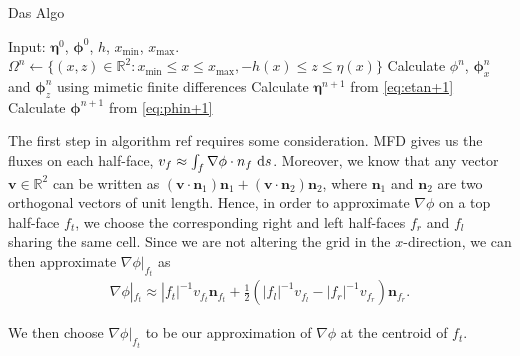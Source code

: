 \documentclass[12pt]{article}
\begin{document}
\begin{algorithm}
    \caption{Das Algo}
	\begin{algorithmic}[1]
	\State    Input: $\bm{\eta}^0$, $\bm{\phi}^0$, $h$, $x_{\min}$, $x_{\max}$.
	        \State    $\Omega^n \leftarrow \{(x,z) \in \mathbb{R}^2 : x_{\min} \leq x \leq x_{\max}, -h(x) \leq z \leq \eta(x)\}$ 
			\State    Calculate $\phi^{n}$, $\bm{\phi}_x^n$ and $\bm{\phi}_z^n$ using mimetic finite differences
			\State    Calculate $\bm{\eta}^{n+1}$ from \eqref{eq:etan+1}
			\State    Calculate $\bm{\phi}^{n+1}$ from \eqref{eq:phin+1}
        \EndFor
	\end{algorithmic}
\end{algorithm}

The first step in algorithm ref requires some consideration. MFD gives us the fluxes on each half-face, $v_{f} \approx \int_{f} \nabla \phi \cdot n_{f} \, \operatorname{d}\! s$.
Moreover, we know that any vector $\bm{v} \in \mathbb{R}^2$ can be written as $(\bm{v}\cdot\bm{n}_1) \bm{n}_1 + (\bm{v}\cdot\bm{n}_2) \bm{n}_2$,
where $\bm{n}_1$ and $\bm{n}_2$ are two orthogonal vectors of unit length.
Hence, in order to approximate $\nabla \phi$ on a top half-face $f_t$, we choose the corresponding right and left half-faces $f_r$ and $f_l$ sharing the same cell.
Since we are not altering the grid in the $x$-direction, we can then approximate $\nabla \phi|_{f_t}$ as
\begin{align*}
    \nabla \phi|_{f_t} \approx |f_t|^{-1} v_{f_t} \bm{n}_{f_t} + \frac{1}{2}(|f_l|^{-1}v_{f_l}-|f_r|^{-1}v_{f_r})\bm{n}_{f_r}.
\end{align*}

We then choose $\nabla \phi|_{f_t}$ to be our approximation of $\nabla \phi$ at the centroid of $f_t$.
\end{document}
